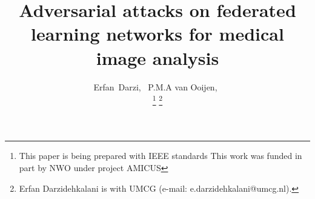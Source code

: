 %
%






\documentclass[journal]{IEEEtran}
\usepackage{emoji}
\usepackage[graphicx]{realboxes}
\usepackage{xcolor,soul,framed} %
\usepackage{cite}
\usepackage{multirow}
\usepackage{fontawesome}
\usepackage[pdftex]{graphicx}
\graphicspath{{../pdf/}{../jpeg/}}
\usepackage{caption}
\usepackage{subcaption}
\usepackage[cmex10]{amsmath}
\usepackage{comment}
\usepackage{enumerate}%

\usepackage[linesnumbered,ruled,vlined]{algorithm2e}







    \title{Adversarial attacks on federated learning networks for medical image analysis}
  \author{Erfan~Darzi,~
      P.M.A van Ooijen,~

  \thanks{ This paper is being prepared with IEEE standards This work was funded in part by NWO under project AMICUS}
  \thanks{Erfan Darzidehkalani is with UMCG (e-mail: e.darzidehkalani@umcg.nl).}%
  }

